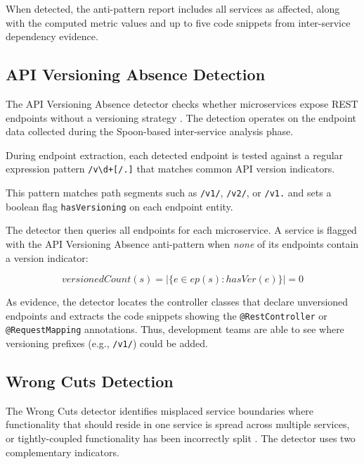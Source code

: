 When detected, the anti-pattern report includes all services as affected, along with the computed metric values and up to five code snippets from inter-service dependency evidence.

\subsection{API Versioning Absence Detection}
\label{subsec:detect-versioning-absence}

\par The API Versioning Absence detector checks whether microservices expose REST endpoints without a versioning strategy \cite{Richardson2018}. The detection operates on the endpoint data collected during the Spoon-based inter-service analysis phase.

During endpoint extraction, each detected endpoint is tested against a regular expression pattern  \texttt{/v\textbackslash d+[/.]} that matches common API version indicators.

\noindent This pattern matches path segments such as \texttt{/v1/}, \texttt{/v2/}, or \texttt{/v1.} and sets a boolean flag \texttt{hasVersioning} on each endpoint entity.

The detector then queries all endpoints for each microservice. A service is flagged with the API Versioning Absence anti-pattern when \textit{none} of its endpoints contain a version indicator:

\begin{equation}
    \mathit{versionedCount}(s) = \bigl|\{e \in \mathit{ep}(s) : \mathit{hasVer}(e)\}\bigr| = 0
    \label{eq:api-versioning-detection}
\end{equation}

As evidence, the detector locates the controller classes that declare unversioned endpoints and extracts the code snippets showing the \texttt{@RestController} or \texttt{@Re\-questMap\-ping} annotations. Thus, development teams are able to see where versioning prefixes (e.g., \texttt{/v1/}) could be added.

\subsection{Wrong Cuts Detection}
\label{subsec:detect-wrong-cuts}

\par The Wrong Cuts detector identifies misplaced service boundaries where functionality that should reside in one service is spread across multiple services, or tightly-coupled functionality has been incorrectly split \cite{Taibi2018}. The detector uses two complementary indicators.

